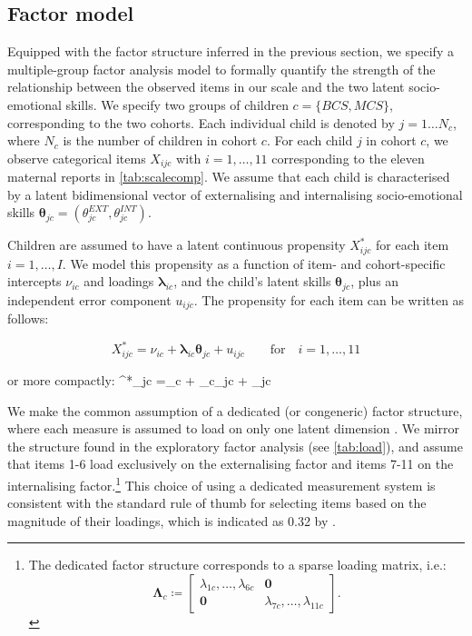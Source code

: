\subsection{Factor model \label{sec:fm}}

Equipped with the factor structure inferred in the previous section, we specify a multiple-group factor analysis model to formally quantify the strength of the relationship between the observed items in our scale and the two latent socio-emotional skills. We specify two groups of children $c=\{BCS,MCS\}$, corresponding to the two cohorts. Each individual child is denoted by $j=1\dots N_c$, where $N_c$ is the number of children in cohort $c$. For each child $j$ in cohort $c$, we observe categorical items $X_{ijc}$ with $i=1,\dots,11$ corresponding to the eleven maternal reports in \autoref{tab:scalecomp}. We assume that each child is characterised by a latent bidimensional vector of externalising and internalising socio-emotional skills $\bm{\theta}_{jc} = (\theta_{jc}^{EXT},\theta_{jc}^{INT})$.

Children are assumed to have a latent continuous propensity $X^*_{ijc}$ for each item $i=1,\dots,I$. We model this propensity as a function of item- and cohort-specific intercepts $\nu_{ic}$ and loadings $\bm{\lambda}_{ic}$, and the child's latent skills $\bm{\theta}_{jc}$, plus an independent error component $u_{ijc}$. The propensity for each item can be written as follows:

$$X^*_{ijc} =\nu_{ic} + \bm{\lambda}_{ic}\bm{\theta}_{jc} + u_{ijc} \qquad \text{for} \quad i = 1,\dots,11$$

or more compactly:
\be\label{eq:propens}
^*_{jc} =\bm{\nu}_c + \bm{\Lambda}_{c}\bm{\theta}_{jc} + _{jc}
\ee

We make the common assumption of a dedicated (or congeneric) factor structure, where each measure is assumed to load on only one latent dimension \citep{Heckman2013,Conti2010a,Attanasio2018a}. We mirror the structure found in the exploratory factor analysis (see \autoref{tab:load}), and assume that items 1-6 load exclusively on the externalising factor and items 7-11 on the internalising factor.\footnote{The dedicated factor structure corresponds to a sparse loading matrix, i.e.: $$\bm{\Lambda}_{c} \coloneqq \begin{bmatrix} \lambda_{1c}, \dots, \lambda_{6c} & \bm{0} \\ \bm{0} & \lambda_{7c}, \dots, \lambda_{11c} \end{bmatrix}.$$} This choice of using a dedicated measurement system is consistent with the standard rule of thumb for selecting items based on the magnitude of their loadings, which is indicated as 0.32 by \citet{Tabachnick2001}.


